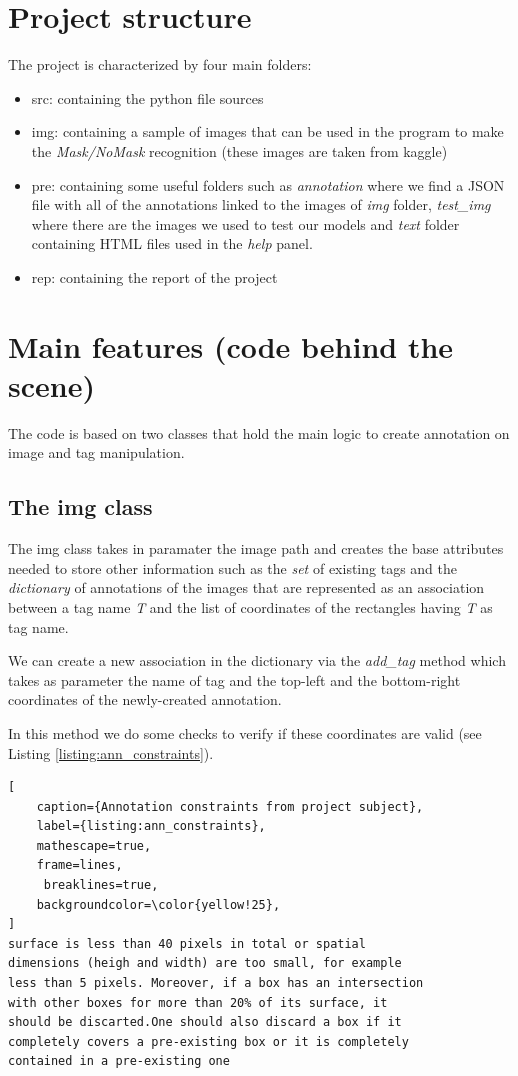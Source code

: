 \documentclass[a4paper,12pt]{article}
\begin{document}
\section{Project structure}
The project is characterized by four main folders:
\begin{itemize}
  \item src: containing the python file sources
  \item img: containing a sample of images that can be used in the program to make the \textit{Mask/NoMask} recognition (these images are taken from kaggle)
  \item pre: containing some useful folders such as \textit{annotation} where we find a JSON file with all of the annotations linked to the images of \textit{img} folder, \textit{test\_img} where there are the images we used to test our models and \textit{text} folder containing HTML files used in the \textit{help} panel.
  \item rep: containing the report of the project
\end{itemize}

\section{Main features (code behind the scene)}
The code is based on two classes that hold the main logic to create annotation on image and tag manipulation.

\subsection{The img class}

The img class takes in paramater the image path and creates the base attributes needed to store other information such as the \textit{set} of existing tags and the \textit{dictionary} of annotations of the images that are represented as an association between a tag name \textit{T} and the list of coordinates of the rectangles having \textit{T} as tag name.

We can create a new association in the dictionary via the \textit{add\_tag} method which takes as parameter the name of tag and the top-left and the bottom-right coordinates of the newly-created annotation.

In this method we do some checks to verify if these coordinates are valid (see Listing \ref{listing:ann_constraints}).

\begin{lstlisting}[
    caption={Annotation constraints from project subject},
    label={listing:ann_constraints},
    mathescape=true, 
    frame=lines,
     breaklines=true,
    backgroundcolor=\color{yellow!25},
]
surface is less than 40 pixels in total or spatial
dimensions (heigh and width) are too small, for example
less than 5 pixels. Moreover, if a box has an intersection
with other boxes for more than 20% of its surface, it 
should be discarted.One should also discard a box if it
completely covers a pre-existing box or it is completely
contained in a pre-existing one
\end{lstlisting}
\end{document}
